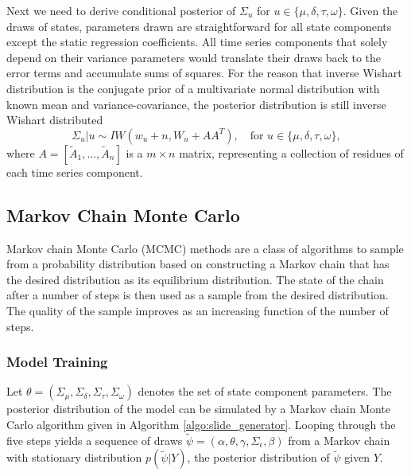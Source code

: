 \documentclass[twoside,11pt]{article}
\begin{document}
Next we need to derive conditional posterior of $\Sigma_u$ for $u\in \{\mu,\delta,\tau,\omega\}$.
Given the draws of states, parameters drawn are straightforward for all state components except the static regression coefficients. All time series components that solely depend on their variance parameters would translate their draws back to the error terms and accumulate sums of squares. For the reason that inverse Wishart distribution is the conjugate prior of a multivariate normal distribution with known mean and variance-covariance, the posterior distribution is still inverse Wishart distributed
\begin{equation} \label{eq:30}
\Sigma_u|u \sim IW(w_u+n,W_u+AA^T), \quad \text{for } u\in\{\mu,\delta,\tau,\omega\},
\end{equation}
where $A=[\tilde{A}_1,\dots,\tilde{A}_n]$ is a $m\times n$ matrix, representing a collection of residues of each time series component.

\subsection{Markov Chain Monte Carlo}
Markov chain Monte Carlo (MCMC) methods are a class of algorithms to sample from a probability distribution based on constructing a Markov chain that has the desired distribution as its equilibrium distribution. The state of the chain after a number of steps is then used as a sample from the desired distribution. The quality of the sample improves as an increasing function of the number of steps.

\subsubsection{Model Training}
Let $\theta=(\Sigma_\mu,\Sigma_\delta,\Sigma_\tau,\Sigma_\omega)$ denotes the set of state component parameters. The posterior distribution of the model can be simulated by a Markov chain Monte Carlo algorithm given in Algorithm \ref{algo:slide_generator}. Looping through the five steps yields a sequence of draws $\tilde{\psi}=(\alpha,\theta,\gamma,\Sigma_\epsilon, \beta)$ from a Markov chain with stationary distribution $p(\tilde{\psi}|Y)$, the posterior distribution of $\tilde{\psi}$ given $Y$.
\end{document}
